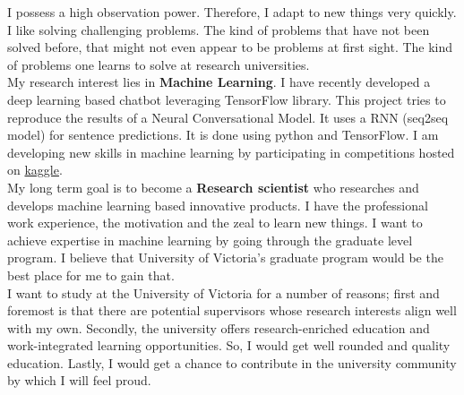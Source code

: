 \documentclass{article}
\begin{document}
I possess a high observation power. Therefore, I adapt to new things very quickly. I like solving challenging problems. The kind of problems that have not been solved before, that might not even appear to be problems at first sight. The kind of problems one learns to solve at research universities.\\

My research interest lies in \textbf{Machine Learning}. I have recently developed a deep learning based chatbot leveraging TensorFlow library. This project tries to reproduce the results of a Neural Conversational Model. It uses a RNN (seq2seq model) for sentence predictions. It is done using python and TensorFlow. I am developing new skills in machine learning by participating in competitions hosted on \href{https://www.kaggle.com/}{kaggle}.\\

My long term goal is to become a \textbf{Research scientist} who researches and develops machine learning based innovative products. I have the professional work experience, the motivation and the zeal to learn new things. I want to achieve expertise in machine learning by going through the graduate level program. I believe that University of Victoria’s graduate program would be the best place for me to gain that.\\

I want to study at the University of Victoria for a number of reasons; first and foremost is that there are potential supervisors whose research interests align well with my own. Secondly, the university offers research-enriched education and work-integrated learning opportunities. So, I would get well rounded and quality education. Lastly, I would get a chance to contribute in the university community by which I will feel proud.\\

  
\end{document}
